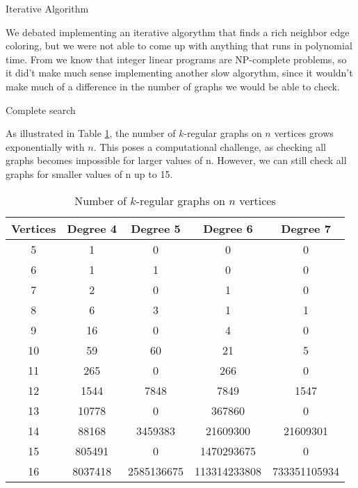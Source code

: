 \documentclass[12pt,a4paper]{amsart}
\makeatletter
\renewcommand\section{\@startsection{section}{1}
  \z@{.5\linespacing\@plus.7\linespacing}{.5\linespacing}
  {\normalfont\scshape\large\centering}}
\renewcommand\subsection{\@startsection{subsection}{2}
  \z@{.5\linespacing\@plus.7\linespacing}{.5\linespacing}
  {\normalfont\scshape}}
\theoremstyle{definition} %
\theoremstyle{plain} %
\makeatother
\begin{document}
    \subsection{Iterative Algorithm}
            
        We debated implementing an iterative algorythm that finds a rich neighbor edge coloring, but we were not able to come up with anything that runs in polynomial time. From \cite{10.1007/978-3-642-95322-4_17} we know that integer linear programs are NP-complete problems, so it did't make much sense implementing another slow algorythm, since it wouldn't make much of a difference in the number of graphs we would be able to check.

\pagebreak

\section{Complete search}

    As illustrated in Table \ref{table:1}, the number of $k$-regular graphs on $n$ vertices grows exponentially with $n$. This poses a computational challenge, as checking all graphs becomes impossible for larger values of n. However, we can still check all graphs for smaller values of n up to 15.

    \begin{table}[!htbp]
        \centering
        \begin{tabular}{|c|c|c|c|c|}
            \hline
            Vertices & Degree 4 & Degree 5 & Degree 6 & Degree 7 \\
            \hline
            5 & 1 & 0 & 0 & 0 \\
            6 & 1 & 1 & 0 & 0 \\
            7 & 2 & 0 & 1 & 0 \\
            8 & 6 & 3 & 1 & 1 \\
            9 & 16 & 0 & 4 & 0 \\
            10 & 59 & 60 & 21 & 5 \\
            11 & 265 & 0 & 266 & 0 \\
            12 & 1544 & 7848 & 7849 & 1547 \\
            13 & 10778 & 0 & 367860 & 0 \\
            14 & 88168 & 3459383 & 21609300 & 21609301 \\
            15 & 805491 & 0 & 1470293675 & 0 \\
            16 & 8037418 & 2585136675 & 113314233808 & 733351105934 \\
            \hline
        \end{tabular}
        \caption{Number of $k$-regular graphs on $n$ vertices \cite{meringer1999fast}
        }
        \label{table:1}
    \end{table}
\end{document}
